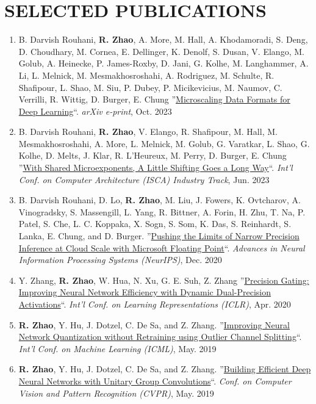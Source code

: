 \documentclass[11pt,a4paper,roman]{moderncv}        %
\newcommand{\BF}[1]{\textbf{#1}}
\newcommand{\IT}[1]{\textit{#1}}
\newcommand{\UL}[1]{\uline{#1}}
\newcommand*{\customcvpub}[5][.5em]{
  {#2 ''\UL{#3}``. \IT{#4}, #5}
  \par\addvspace{#1}
}
\begin{document}
\section{SELECTED PUBLICATIONS}
\vspace{1mm}
\begin{minipage}{\maincolumnwidth}%
\small{
    \begin{enumerate}
        \item \customcvpub{B. Darvish Rouhani, \BF{R. Zhao}, A. More, M. Hall, A. Khodamoradi, S. Deng, D. Choudhary, M. Cornea, E. Dellinger, K. Denolf, S. Dusan, V. Elango, M. Golub, A. Heinecke, P. James-Roxby, D. Jani, G. Kolhe, M. Langhammer, A. Li, L. Melnick, M. Mesmakhosroshahi, A. Rodriguez, M. Schulte, R. Shafipour, L. Shao, M. Siu, P. Dubey, P. Micikevicius, M. Naumov, C. Verrilli, R. Wittig, D. Burger, E. Chung}{Microscaling Data Formats for Deep Learning}{arXiv e-print}{Oct. 2023}
        \item \customcvpub{B. Darvish Rouhani, \BF{R. Zhao}, V. Elango, R. Shafipour, M. Hall, M. Mesmakhosroshahi, A. More, L. Melnick, M. Golub, G. Varatkar, L. Shao, G. Kolhe, D. Melts, J. Klar, R. L'Heureux, M. Perry, D. Burger, E. Chung}{With Shared Microexponents, A Little Shifting Goes a Long Way}{Int'l Conf. on Computer Architecture (ISCA) Industry Track}{Jun. 2023}
        \item \customcvpub{B. Darvish Rouhani, D. Lo, \BF{R. Zhao}, M. Liu, J. Fowers, K. Ovtcharov, A. Vinogradsky, S. Massengill, L. Yang, R. Bittner, A. Forin, H. Zhu, T. Na, P. Patel, S. Che, L. C. Koppaka, X. Sogn, S. Som, K. Das, S. Reinhardt, S. Lanka,  E. Chung, and D. Burger.}{Pushing the Limits of Narrow Precision Inference at Cloud Scale with Microsoft Floating Point}{Advances in Neural Information Processing Systems (NeurIPS)}{Dec. 2020}
        \item \customcvpub{Y. Zhang, \BF{R. Zhao}, W. Hua, N. Xu, G. E. Suh, Z. Zhang}{Precision Gating: Improving Neural Network Efficiency with Dynamic Dual-Precision Activations}{Int'l Conf. on Learning Representations (ICLR)}{Apr. 2020}
        \item \customcvpub{\BF{R. Zhao}, Y. Hu, J. Dotzel, C. De Sa, and Z. Zhang.}{Improving Neural Network Quantization without Retraining using Outlier Channel Splitting}{Int'l Conf. on Machine Learning (ICML)}{May. 2019}
        \item \customcvpub{\BF{R. Zhao}, Y. Hu, J. Dotzel, C. De Sa, and Z. Zhang.}{Building Efficient Deep Neural Networks with Unitary Group Convolutions}{Conf. on Computer Vision and Pattern Recognition (CVPR)}{May. 2019}

\end{enumerate}}
\end{minipage}
\end{document}
